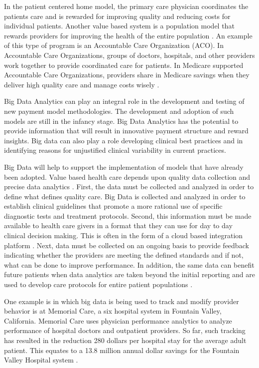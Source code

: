 \documentclass[sigconf]{acmart}
\begin{document}
In the patient centered home model, the primary care physician coordinates the patients care and is rewarded for improving quality and reducing costs for individual patients. Another value based system is a population model that rewards providers for improving the health of the entire population \cite{www-google-liason}. An example of this type of program is an Accountable Care Organization (ACO). In Accountable Care Organizations, groups of doctors, hospitals, and other providers work together to provide coordinated care for patients. In Medicare supported Accountable Care Organizations, providers share in Medicare savings when they deliver high quality care and manage costs wisely \cite{www-google-ACO}.
 
Big Data Analytics can play an integral role in the development and testing of new payment model methodologies. The development and adoption of such models are still in the infancy stage.  Big Data Analytics has the potential to provide information that will result in innovative payment structure and reward insights.  Big data can also play a role developing clinical best practices and in identifying reasons for unjustified clinical variability in current practices.

Big Data will help to support the implementation of models that have already been adopted. Value based health care depends upon quality data collection and precise data analytics \cite{www-google-liason}.  First, the data must be collected and analyzed in order to define what defines quality care. Big Data is collected and analyzed in order to establish clinical guidelines that promote a more rational use of specific diagnostic tests and treatment protocols.  Second, this information must be made available to health care givers in a format that they can use for day to day clinical decision making. This is often in the form of a cloud based integration platform \cite{www-google-liason}.  Next, data must be collected on an ongoing basis to provide feedback indicating whether the providers are meeting the defined standards and if not, what can be done to improve performance. In addition, the same data can benefit future patients when data analytics are taken beyond the initial reporting and are used to develop care protocols for entire patient populations \cite{www-google-liason}. 

One example is in which big data is being used to track and modify provider behavior is at Memorial Care, a six hospital system in Fountain Valley, California. Memorial Care uses physician performance analytics to analyze performance of hospital doctors and outpatient providers.  So far, such tracking has resulted in the reduction 280 dollars per hospital stay for the average adult patient. This equates to a 13.8 million annual dollar savings for the Fountain Valley Hospital system \cite{www-google-data}.
 
\end{document}
